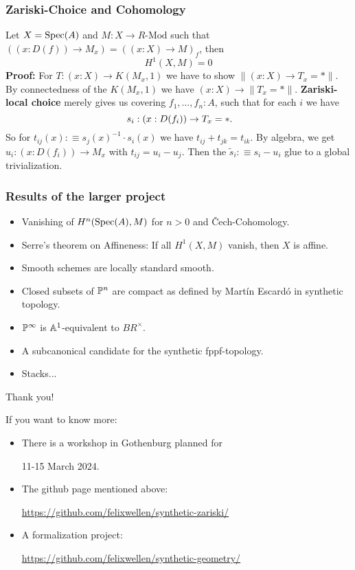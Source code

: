 \documentclass{beamer}
\begin{document}
\begin{frame}
  \frametitle{Zariski-Choice and Cohomology}  
  Let $X=\operatorname{Spec}(A)$ and $M:X\to R\text{-Mod}$ such that $((x:D(f))\to M_x)=((x:X)\to M)_f$, then
  \[ H^1(X,M)=0 \]
  \pause
  \textbf{Proof:} For $T: (x:X)\to K(M_x,1)$ we have to show $\|(x:X)\to T_x=\ast\|$.
  \pause
  By connectedness of the $K(M_x,1)$ we have $(x:X)\to \|T_x=\ast\|$.
  \pause
  \textbf{Zariski-local choice} merely gives us covering $f_1,\dots,f_n:A$, such that for each $i$ we have
  \[
    s_i:(x:D(f_i)) \to T_x=\ast
    \rlap{.}
  \]
  \pause
  So for $t_{ij}(x):\equiv s_j(x)^{-1}\cdot s_i(x)$ we have $t_{ij}+t_{jk}=t_{ik}$.
  \pause
  By algebra, we get $u_i:(x:D(f_i))\to M_x$ with $t_{ij}=u_i-u_j$.
  Then the $\tilde{s}_i:\equiv s_i-u_i$ glue to a global trivialization.
\end{frame}

\begin{frame}
  \frametitle{Results of the larger project}
  \begin{itemize}
  \item Vanishing of $H^n(\operatorname{Spec}(A),M)$ for $n>0$ and \v{C}ech-Cohomology.
  \item Serre's  theorem on Affineness: If all $H^1(X,M)$ vanish, then $X$ is affine.
  \item Smooth schemes are locally standard smooth.
  \item Closed subsets of $\mathbb{P}^n$ are compact as defined by Martín Escardó in synthetic topology.
  \item $\mathbb{P}^\infty$ is $\mathbb{A}^1$-equivalent to $BR^\times$.
  \item A subcanonical candidate for the synthetic fppf-topology.
  \item Stacks...
  \end{itemize}
\end{frame}

\begin{frame}
  \vspace{0.5cm}
  \begin{center}
    Thank you! \\
  \end{center}
  \pause
  \vspace{1cm}
  If you want to know more:
  \begin{itemize}
  \item There is a workshop in Gothenburg planned for 
    \begin{center}
      11-15 March 2024. 
    \end{center}
  \item
    The github page mentioned above:
    \begin{center}
      \url{https://github.com/felixwellen/synthetic-zariski/} 
    \end{center}
  \item
    A formalization project:
    \begin{center}
      \url{https://github.com/felixwellen/synthetic-geometry/} 
    \end{center}
  \end{itemize}
\end{frame}
\end{document}
